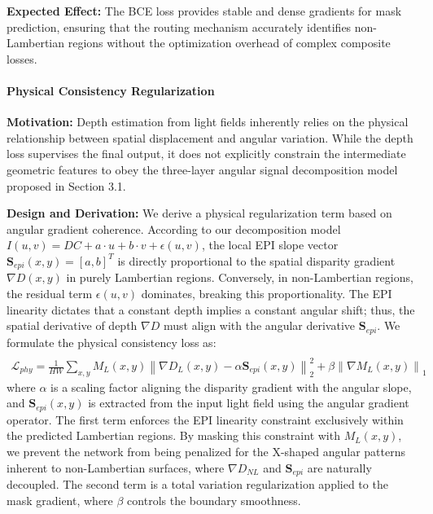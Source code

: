 \documentclass[lettersize,journal]{IEEEtran}
\begin{document}
\textbf{Expected Effect:} The BCE loss provides stable and dense gradients for mask prediction, ensuring that the routing mechanism accurately identifies non-Lambertian regions without the optimization overhead of complex composite losses.

\paragraph{Physical Consistency Regularization}
\textbf{Motivation:} Depth estimation from light fields inherently relies on the physical relationship between spatial displacement and angular variation. While the depth loss supervises the final output, it does not explicitly constrain the intermediate geometric features to obey the three-layer angular signal decomposition model proposed in Section 3.1.

\textbf{Design and Derivation:} We derive a physical regularization term based on angular gradient coherence. According to our decomposition model $I(u,v) = DC + a \cdot u + b \cdot v + \epsilon(u,v)$, the local EPI slope vector $\mathbf{S}_{epi}(x,y) = [a, b]^T$ is directly proportional to the spatial disparity gradient $\nabla D(x,y)$ in purely Lambertian regions. Conversely, in non-Lambertian regions, the residual term $\epsilon(u,v)$ dominates, breaking this proportionality. The EPI linearity dictates that a constant depth implies a constant angular shift; thus, the spatial derivative of depth $\nabla D$ must align with the angular derivative $\mathbf{S}_{epi}$. We formulate the physical consistency loss as:
\begin{multline}
 \\
\mathcal{L}_{phy} = \frac{1}{HW} \sum_{x,y} M_{L}(x,y) \left\| \nabla D_{L}(x,y) - \alpha \mathbf{S}_{epi}(x,y) \right\|_2^2 + \beta \left\| \nabla M_{L}(x,y) \right\|_1
\label{eq:ch3_26}
\end{multline}
where $\alpha$ is a scaling factor aligning the disparity gradient with the angular slope, and $\mathbf{S}_{epi}(x,y)$ is extracted from the input light field using the angular gradient operator. The first term enforces the EPI linearity constraint exclusively within the predicted Lambertian regions. By masking this constraint with $M_{L}(x,y)$, we prevent the network from being penalized for the X-shaped angular patterns inherent to non-Lambertian surfaces, where $\nabla D_{NL}$ and $\mathbf{S}_{epi}$ are naturally decoupled. The second term is a total variation regularization applied to the mask gradient, where $\beta$ controls the boundary smoothness.
\end{document}
